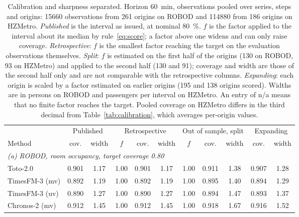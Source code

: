 \documentclass[utf8]{FrontiersinHarvard}
\newif\ifsecondrevisionmarkup
\newcommand{\rev}[1]{\ifsecondrevisionmarkup\textcolor{revisiontwo}{#1}\else#1\fi}
\newcommand{\revcolor}{\ifsecondrevisionmarkup\color{revisiontwo}\fi}
\theoremstyle{plain}
\theoremstyle{definition}
\theoremstyle{remark}
\begin{document}
\rev{\begin{table}[htbp]
\centering
\revcolor
\caption{\rev{Calibration and sharpness separated. Horizon \SI{60}{\minute}, observations pooled over series, steps and origins: \num{15660} observations from \num{261} origins on ROBOD and \num{114880} from \num{186} origins on HZMetro. \emph{Published} is the interval as issued, at nominal \SI{80}{\percent}. $f$ is the factor applied to the interval about its median by rule~\eqref{eq:score}; a factor above one widens and can only raise coverage. \emph{Retrospective}: $f$ is the smallest factor reaching the target on the evaluation observations themselves. \emph{Split}: $f$ is estimated on the first half of the origins (\num{130} on ROBOD, \num{93} on HZMetro) and applied to the second half (\num{130} and \num{91}); coverage and width are those of the second half only and are not comparable with the retrospective columns. \emph{Expanding}: each origin is scaled by a factor estimated on earlier origins (\num{195} and \num{138} origins scored). Widths are in persons on ROBOD and passengers per interval on HZMetro. An entry of n/a means that no finite factor reaches the target. Pooled coverage on HZMetro differs in the third decimal from Table~\ref{tab:calibration}, which averages per-origin values.}}
\label{tab:matched}
\scriptsize
\setlength{\tabcolsep}{3.2pt}
\begin{tabular}{lcc@{\hspace{9pt}}ccc@{\hspace{9pt}}ccc@{\hspace{9pt}}cc}
\toprule
& \multicolumn{2}{c}{Published} & \multicolumn{3}{c}{Retrospective} & \multicolumn{3}{c}{Out of sample, split} & \multicolumn{2}{c}{Expanding} \\
\cmidrule(lr){2-3}\cmidrule(lr){4-6}\cmidrule(lr){7-9}\cmidrule(lr){10-11}
Method & cov. & width & $f$ & cov. & width & $f$ & cov. & width & cov. & width \\
\midrule
\multicolumn{11}{l}{\emph{(a) ROBOD, room occupancy, target coverage \num{0.80}}}\\
Toto-2.0            & 0.901 & 1.17 & 1.00 & 0.901 & 1.17 & 1.00 & 0.911 & 1.38 & 0.907 & 1.28 \\
TimesFM-3 (mv)      & 0.892 & 1.19 & 1.00 & 0.892 & 1.19 & 1.00 & 0.895 & 1.40 & 0.894 & 1.29 \\
TimesFM-3 (uv)      & 0.890 & 1.27 & 1.00 & 0.890 & 1.27 & 1.00 & 0.894 & 1.47 & 0.893 & 1.37 \\
Chronos-2 (mv)      & 0.912 & 1.45 & 1.00 & 0.912 & 1.45 & 1.00 & 0.918 & 1.67 & 0.916 & 1.52 \\

\end{tabular}
\end{table}}
\end{document}
